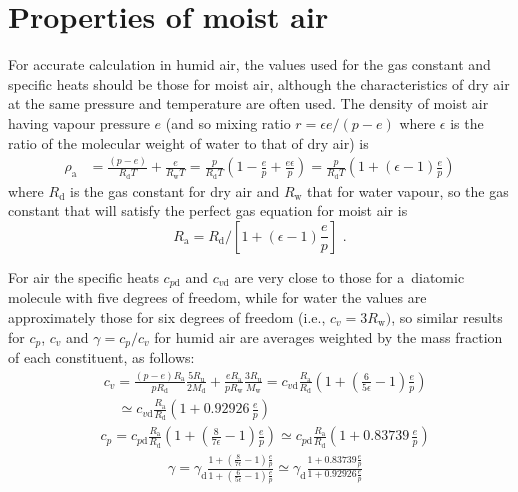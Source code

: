 \documentclass[amtd, online, hvmath]{copernicus}
\begin{document}
\appendix

\section{Properties of moist air}

For accurate calculation in humid air, the values used for the gas
constant and specific heats should be those for moist air, although
the characteristics of dry air at the same pressure and temperature
are often used. The density of moist air having vapour pressure $e$
(and so mixing ratio $r=\epsilon e/(p-e)$ where $\epsilon$ is the
ratio of the molecular weight of water to that of dry air) is
\begin{align}
\rho_{\mathrm{a}} & =
\frac{(p-e)}{R_{\mathrm{d}}T}+\frac{e}{R_{\mathrm{w}}T}=\frac{p}{R_{\mathrm{d}}T}\left(1-\frac{e}{p}+\frac{e\epsilon}{p}\right) = \frac{p}{R_{\mathrm{d}}T}\left(1+(\epsilon-1)\frac{e}{p}\right)\label{eq:MoistAirDensity-1}
\end{align}
where $R_{\mathrm{d}}$ is the gas constant for dry air and
$R_{\mathrm{w}}$ that for water vapour, so the gas constant that will
satisfy the perfect gas equation for moist air is
\begin{equation}
R_{\mathrm{a}}=R_{\mathrm{d}}/\left[1+(\epsilon-1)\frac{e}{p}\right]\,\,.\label{eq:moistR-1}
\end{equation}

For air the specific heats $c_{p\mathrm{d}}$ and
$c_{v\mathrm{d}}$ are very close to
those for a~diatomic molecule with five degrees of freedom, while for
water the values are approximately those for six degrees of freedom
(i.e., $c_v=3R_{\mathrm{w}})$, so similar results for $c_p$, $c_v$ and
$\gamma=c_p/c_v$ for humid air are averages weighted by the
mass fraction of each constituent, as follows:
\begin{align}
&c_v  =  \frac{(p-e)R_{\mathrm{a}}}{pR_{\mathrm{d}}}\frac{5R_{\mathrm{u}}}{2M_{\mathrm{d}}}+\frac{eR_{\mathrm{a}}}{pR_{\mathrm{w}}}\frac{3R_{\mathrm{u}}}{M_{\mathrm{w}}}
  = c_{v\mathrm{d}}\frac{R_{\mathrm{a}}}{R_{\mathrm{d}}}\left(1+\left(\frac{6}{5\epsilon}-1\right)\frac{e}{p}\right)\nonumber\\
&\quad \simeq c_{v\mathrm{d}}\frac{R_{\mathrm{a}}}{R_{\mathrm{d}}}\left(1+0.92926\,\frac{e}{p}\right)\label{eq:moistcv-1}
\end{align}
\begin{align}
&c_p  =
c_{p\mathrm{d}}\frac{R_{\mathrm{a}}}{R_{\mathrm{d}}}\left(1+\left(\frac{8}{7\epsilon}-1\right)\frac{e}{p}\right)
\simeq
c_{p\mathrm{d}}\frac{R_{\mathrm{a}}}{R_{\mathrm{d}}}\left(1+0.83739\,\frac{e}{p}\right)\label{eq:moistcp-1}
\end{align}
\begin{align}
&\gamma=\gamma_{\mathrm{d}}\frac{1+\left(\frac{8}{7\epsilon}-1\right)\frac{e}{p}}{1+\left(\frac{6}{5\epsilon}-1\right)\frac{e}{p}}\simeq\gamma_{\mathrm{d}}\frac{1+0.83739\frac{e}{p}}{1+0.92926\frac{e}{p}}\label{eq:moistgamma-1}
\end{align}
\end{document}
